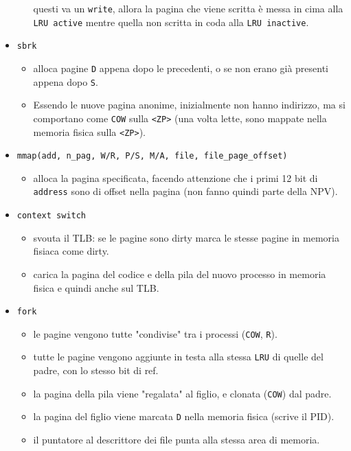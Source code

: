 \documentclass[12pt, a4paper]{report}
\begin{document}
\begin{itemize}
\begin{itemize}
				questi va un \texttt{write}, allora la pagina che viene scritta
				è messa in cima alla \texttt{LRU active} mentre quella non
				scritta in coda alla \texttt{LRU inactive}.
		\end{itemize}
	\item \texttt{sbrk}
		\begin{itemize}
			\item alloca pagine \texttt{D} appena dopo le precedenti, o se non
				erano già presenti appena dopo \texttt{S}.
			\item Essendo le nuove pagina anonime, inizialmente non hanno
				indirizzo, ma si comportano come \texttt{COW} sulla
				\texttt{<ZP>} (una volta lette, sono mappate nella memoria
				fisica sulla \texttt{<ZP>}).
		\end{itemize}
	\item \texttt{mmap(add, n\_pag, W/R, P/S, M/A, file, file\_page\_offset)}
		\begin{itemize}
			\item alloca la pagina specificata, facendo attenzione che i primi
				12 bit di \texttt{address} sono di offset nella pagina (non fanno
				quindi parte della NPV).
		\end{itemize}
	\item \texttt{context switch}
		\begin{itemize}
			\item svouta il TLB: se le pagine sono dirty marca le stesse pagine
				in memoria fisiaca come dirty.
			\item carica la pagina del codice e della pila del nuovo processo in
				memoria fisica e quindi anche sul TLB.
		\end{itemize}
	\item \texttt{fork}
		\begin{itemize}
			\item le pagine vengono tutte "condivise" tra i processi
				(\texttt{COW}, \texttt{R}).
			\item tutte le pagine vengono aggiunte in testa alla stessa
				\texttt{LRU} di quelle del padre, con lo stesso bit di ref.
			\item la pagina della pila viene "regalata" al figlio, e clonata
				(\texttt{COW}) dal padre.
			\item la pagina del figlio viene marcata \texttt{D} nella memoria
				fisica (scrive il PID).
			\item il puntatore al descrittore dei file punta alla stessa area di
				memoria.
		\end{itemize}

\end{itemize}
\end{document}
